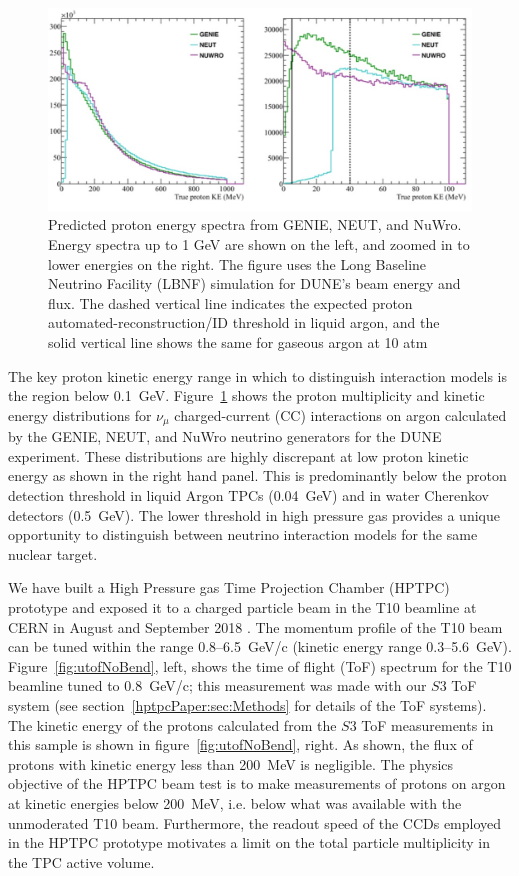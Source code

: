 \begin{figure}%
    \centering
    \includegraphics[width=12cm]{files/Figures/protons_from_argon.jpeg}%
    \caption{Predicted proton energy spectra from GENIE, NEUT, and NuWro\cite{Raaf:2018aaa}. Energy spectra up to 1 GeV are shown on the left, and zoomed in to lower energies on the right. The figure uses the Long Baseline Neutrino Facility (LBNF) simulation for DUNE's beam energy and flux. The dashed vertical line indicates the expected proton automated-reconstruction/ID threshold in liquid argon, and the solid vertical line shows the same for gaseous argon at 10 atm~\cite{dune2018high}}
    \label{fig:protonsfromargon}%
\end{figure}

The key proton kinetic energy range in which to distinguish interaction models is the region below 0.1~GeV.
Figure~\ref{fig:protonsfromargon} shows the proton multiplicity and kinetic energy distributions for $\nu_{\mu}$ charged-current (CC) interactions on argon calculated by the GENIE, NEUT, and NuWro neutrino generators for the DUNE experiment.
These distributions are highly discrepant at low proton kinetic energy as shown in the right hand panel.
This is predominantly below the proton detection threshold in liquid Argon TPCs (0.04~GeV) and in water Cherenkov detectors (0.5~GeV).
The lower threshold in high pressure gas provides a unique opportunity to distinguish between neutrino interaction models for the same nuclear target.

We have built a High Pressure gas Time Projection Chamber (HPTPC) prototype and exposed it to a charged particle beam in the T10 beamline at CERN in August and September 2018 \cite{SPSC-P-355}.
The momentum profile of the T10 beam can be tuned within the range 0.8--6.5~GeV/c (kinetic energy range 0.3--5.6~GeV). 
Figure~\ref{fig:utofNoBend}, left, shows the time of flight (ToF) spectrum for the T10 beamline tuned to 0.8~GeV/c; this measurement was made with our $\mathit{S3}$ ToF system (see section~\ref{hptpcPaper:sec:Methods} for details of the ToF systems).
The kinetic energy of the protons calculated from the $\mathit{S3}$ ToF measurements in this sample is shown in figure~\ref{fig:utofNoBend}, right.
As shown, the flux of protons with kinetic energy less than 200~MeV is negligible.
The physics objective of the HPTPC beam test is to make measurements of protons on argon at kinetic energies below 200~MeV, i.e. below what was available with the unmoderated T10 beam. 
Furthermore, the readout speed of the CCDs employed in the HPTPC prototype motivates a limit on the total particle multiplicity in the TPC active volume.

